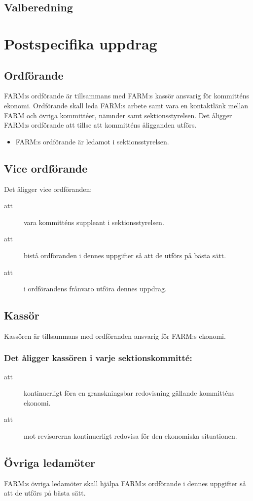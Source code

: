 \documentclass[a4paper]{article}
\begin{document}
\begin{foreningenv}{\forening{}}
    \subsection{Valberedning}
    \aliggvalber{}
    
    \section{Postspecifika uppdrag}
    \subsection{Ordförande}
    FARM:s ordförande är tillsammans med FARM:s kassör ansvarig för kommitténs ekonomi. Ordförande skall leda FARM:s arbete samt vara en kontaktlänk mellan FARM och övriga kommittéer, nämnder samt sektionsstyrelsen. Det åligger FARM:s ordförande att tillse att kommitténs åligganden utförs.
    
    \begin{itemize}
        \item  FARM:s ordförande är ledamot i sektionsstyrelsen.
    \end{itemize}
    
    \subsection{Vice ordförande}
    Det åligger vice ordföranden:
    \begin{description}
        \item[att] vara kommitténs suppleant i sektionsstyrelsen. 
        \item[att] bistå ordföranden i dennes uppgifter så att de utförs på bästa sätt.
        \item[att] i ordförandens frånvaro utföra dennes uppdrag.
    \end{description} 
    
    \subsection{Kassör}
    Kassören är tillsammans med ordföranden ansvarig för FARM:s ekonomi.
    
    \subsubsection{Det åligger kassören i varje sektionskommitté:}
    \begin{description}
        \item[att] kontinuerligt föra en granskningsbar redovisning gällande kommitténs ekonomi.
        \item[att] mot revisorerna kontinuerligt redovisa för den ekonomiska situationen.
    \end{description}
    
    \subsection{Övriga ledamöter}
    FARM:s övriga ledamöter skall hjälpa FARM:s ordförande i dennes uppgifter så att de utförs på bästa sätt.
\end{foreningenv}
\end{document}
